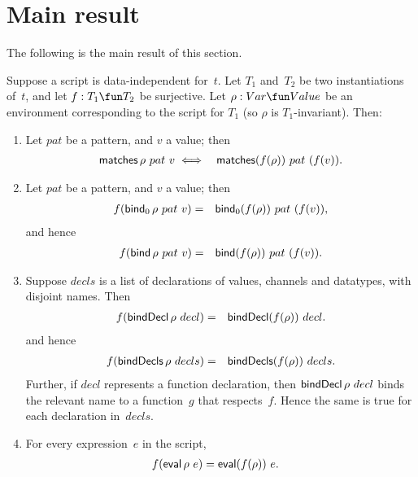 \section{Main result}


The following is the main result of this section.
%
\begin{prop}
\label{prop:expressions}
Suppose a script is data-independent for~$t$.  Let $T_1$ and~$T_2$ be two
instantiations of~$t$, and let $f : T_1 \fun T_2$ be surjective.  Let $\rho:
Var \fun Value$ be an environment corresponding to the script for $T_1$ (so
$\rho$ is $T_1$-invariant). 
Then:

\begin{enumerate}
\item\label{item:matches} Let $pat$ be a pattern, and $v$ a value; then
\begin{eqnarray*}
  \mathop{\sf matches} \rho~ pat~v & \iff & \mathop{\sf matches} (f(\rho)) ~ pat~(f(v)).
\end{eqnarray*}

\item\label{item:bind}
Let $pat$ be a pattern, and $v$ a value; then
\begin{eqnarray*}
f  (\mathop{\sf bind}\nolimits_0 \rho~pat~v) &  = & \mathop{\sf bind}\nolimits_0 (f(\rho))~pat~(f(v)),
\end{eqnarray*}
and hence
\begin{eqnarray*}
f  (\mathop{\sf bind}\nolimits \rho~pat~v) & = & \mathop{\sf bind}\nolimits (f(\rho))~pat~(f(v)).
\end{eqnarray*}

\item\label{item:bindDecls} Suppose $decls$ is a list of declarations of
  values, channels and datatypes, with disjoint names.  Then
  \begin{eqnarray*}
  f (\mathop{\sf bindDecl} \rho~decl) & = & \mathop{\sf bindDecl} (f(\rho))~decl.
  \end{eqnarray*}
  and hence
  \begin{eqnarray*}
  f (\mathop{\sf bindDecls} \rho~decls) & = & \mathop{\sf bindDecls} (f(\rho))~decls.
  \end{eqnarray*}
%
Further, if $decl$ represents a function declaration, then $\mathop{\sf bindDecl}
\rho~decl$ binds the relevant name to a function~$g$ that respects~$f$.  Hence
the same is true for each declaration in~$decls$. 


\item\label{item:eval} For every expression~$e$ in the script,
\begin{eqnarray*}
f(\mathop{\sf eval} \rho ~ e) & = \mathop{\sf eval} (f(\rho)) ~e .
\end{eqnarray*}


\end{enumerate}
\end{prop}
